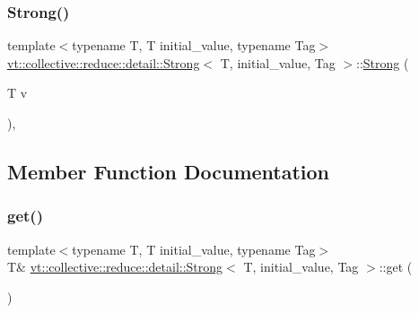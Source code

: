 \mbox{\label{structvt_1_1collective_1_1reduce_1_1detail_1_1_strong_ad7d4a59581e1961b643c853c8e7c58c3}} 
\subsubsection{\texorpdfstring{Strong()}{Strong()}\hspace{0.1cm}{\footnotesize\ttfamily [2/2]}}
{\footnotesize\ttfamily template$<$typename T, T initial\+\_\+value, typename Tag$>$ \\
\hyperlink{structvt_1_1collective_1_1reduce_1_1detail_1_1_strong}{vt\+::collective\+::reduce\+::detail\+::\+Strong}$<$ T, initial\+\_\+value, Tag $>$\+::\hyperlink{structvt_1_1collective_1_1reduce_1_1detail_1_1_strong}{Strong} (\begin{DoxyParamCaption}\item[{T}]{v }\end{DoxyParamCaption})\hspace{0.3cm}{\ttfamily [inline]}, {\ttfamily [explicit]}}



\subsection{Member Function Documentation}
\mbox{\label{structvt_1_1collective_1_1reduce_1_1detail_1_1_strong_a410692a65741df1c5e3a5498f22717c6}} 
\subsubsection{\texorpdfstring{get()}{get()}\hspace{0.1cm}{\footnotesize\ttfamily [1/2]}}
{\footnotesize\ttfamily template$<$typename T, T initial\+\_\+value, typename Tag$>$ \\
T\& \hyperlink{structvt_1_1collective_1_1reduce_1_1detail_1_1_strong}{vt\+::collective\+::reduce\+::detail\+::\+Strong}$<$ T, initial\+\_\+value, Tag $>$\+::get (\begin{DoxyParamCaption}{ }\end{DoxyParamCaption})\hspace{0.3cm}{\ttfamily [inline]}}


